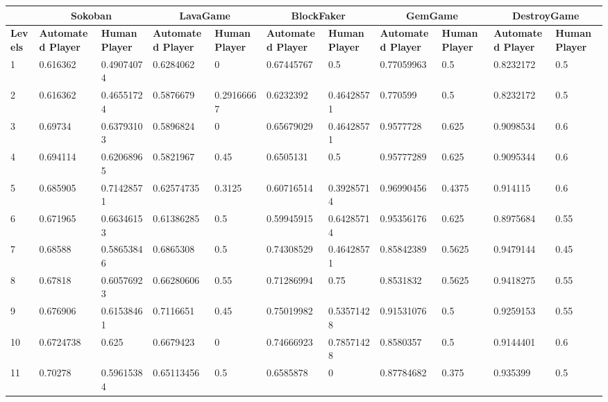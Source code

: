 \begin{landscape}
\begin{table}[!ht]
	\centering
	\begin{tabular}{|p{0.5in}|p{0.75in}|p{0.75in}|p{0.75in}|p{0.75in}|p{0.75in}|p{0.75in}|p{0.75in}|p{0.75in}|p{0.75in}|p{0.75in}|}
		\hline
		 & \multicolumn{2}{c}{\textbf{Sokoban}} & \multicolumn{2}{c}{\textbf{LavaGame}} & \multicolumn{2}{c}{\textbf{\textbf{BlockFaker}}} & \multicolumn{2}{c}{\textbf{GemGame}} & \multicolumn{2}{c}{\textbf{DestroyGame}}\\
		\hline
		\textbf{Levels} & \textbf{Automated Player} & \textbf{Human Player} & \textbf{Automated Player} & \textbf{Human Player} & \textbf{Automated Player} & \textbf{Human Player} & \textbf{Automated Player} & \textbf{Human Player} & \textbf{Automated Player} & \textbf{Human Player}\\
		\hline
		1 & 0.616362 & 0.49074074 & 0.6284062 & 0 & 0.67445767 & 0.5 & 0.77059963 & 0.5 & 0.8232172 & 0.5\\
		\hline
		2 & 0.616362 & 0.46551724 & 0.5876679 & 0.29166667 & 0.6232392 & 0.46428571 & 0.770599 & 0.5 & 0.8232172 & 0.5\\
		\hline
		3 & 0.69734 & 0.63793103 & 0.5896824 & 0 & 0.65679029 & 0.46428571 & 0.9577728 & 0.625 & 0.9098534 & 0.6\\
		\hline
		4 & 0.694114 & 0.62068965 & 0.5821967 & 0.45 & 0.6505131 & 0.5 & 0.95777289 & 0.625 & 0.9095344 & 0.6\\
		\hline
		5 & 0.685905 & 0.71428571 & 0.62574735 & 0.3125 & 0.60716514 & 0.39285714 & 0.96990456 & 0.4375 & 0.914115 & 0.6\\
		\hline
		6 & 0.671965 & 0.66346153 & 0.61386285 & 0.5 & 0.59945915 & 0.64285714 & 0.95356176 & 0.625 & 0.8975684 & 0.55\\
		\hline
		7 & 0.68588 & 0.58653846 & 0.6865308 & 0.5 & 0.74308529 & 0.46428571 & 0.85842389 & 0.5625 & 0.9479144 & 0.45\\
		\hline
		8 & 0.67818 & 0.60576923 & 0.66280606 & 0.55 & 0.71286994 & 0.75 & 0.8531832 & 0.5625 & 0.9418275 & 0.55\\
		\hline
		9 & 0.676906 & 0.61538461 & 0.7116651 & 0.45 & 0.75019982 & 0.53571428 & 0.91531076 & 0.5 & 0.9259153 & 0.55\\
		\hline
		10 & 0.6724738 & 0.625 & 0.6679423 & 0 & 0.74666923 & 0.78571428 & 0.8580357 & 0.5 & 0.9144401 & 0.6\\
		\hline
		11 & 0.70278 & 0.59615384 & 0.65113456 & 0.5 & 0.6585878 & 0 & 0.87784682 & 0.375 & 0.935399 & 0.5\\

\end{tabular}
\end{table}
\end{landscape}
